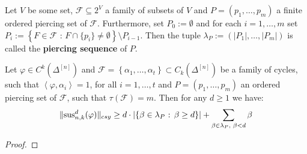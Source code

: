 \begin{defi}
Let \(V\) be some set, \(\mathcal{F}\subseteq 2^V\) a family of subsets of \(V\) and \(P=(p_1,\ldots,p_m)\) a finite ordered piercing set of \(\mathcal{F}\). Furthermore, set \(P_0:=\emptyset\) and for each \(i=1,\ldots,m\) set \(P_i:=\left\{F\in\mathcal{F}\text{ : }F\cap\{p_i\}\neq\emptyset\right\}\setminus P_{i-1}\). Then the tuple \(\lambda_P:=(|P_1|,\ldots,|P_m|)\) is called the \textbf{piercing sequence} of \(P\).
\end{defi}

\begin{prop}
Let \(\varphi\in C^k(\Delta^{[n]})\) and \(\mathcal{F}=\left\{\alpha_1,\ldots,\alpha_t\right\}\subset C_k(\Delta^{[n]})\) be a family of cycles, such that \(\left\langle\varphi,\alpha_i\right\rangle=1\), for all \(i=1,\ldots,t\) and \(P=(p_1,\ldots,p_m)\) an ordered piercing set of \(\mathcal{F}\), such that \(\tau(\mathcal{F})=m\). Then for any \(d\geq 1\) we have:
\[
\|\mathrm{sus}_{n,k}^d(\varphi)\|_{csy}\geq d\cdot\left|\left\{\beta\in\lambda_P\text{ : }\beta\geq d\right\}\right|+\sum\limits_{\beta\in\lambda_P\text{, }\beta<d}\beta
\]
\begin{proof}

\end{proof}
\end{prop}
